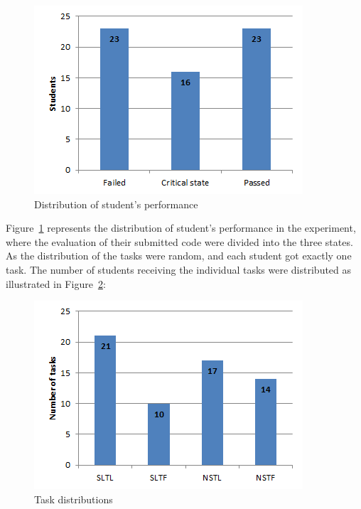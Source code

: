 \documentclass{sig-alternate-05-2015}
\begin{document}
\begin{figure}[!ht]
	\centering
	\includegraphics[width=1\linewidth]{img01}
	\caption{Distribution of student's performance}
	\label{fig:DistributionOfStudentPerformance}
\end{figure}
Figure~\ref{fig:DistributionOfStudentPerformance} represents the distribution of student's performance in the experiment, where the evaluation of their submitted code were divided into the three states.\\

As the distribution of the tasks were random, and each student got exactly one task. The number of students receiving the individual tasks were distributed as illustrated in Figure~\ref{fig:TaskDistributions}:

\begin{figure}[!ht]
	\centering
	\includegraphics[width=1\linewidth]{img02}
	\caption{Task distributions}
	\label{fig:TaskDistributions}
\end{figure}
\end{document}
